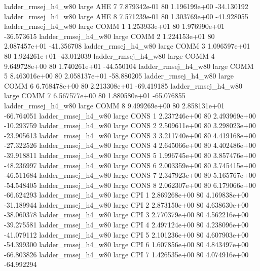 ladder_rmsej_h4_w80      large      AHE                 7 7.879342e-01 80   1.196199e+00         -34.130192
ladder_rmsej_h4_w80      large      AHE                 8 7.571239e-01 80   1.303769e+00         -41.928055
ladder_rmsej_h4_w80      large     COMM                 1 1.253933e+01 80   1.976990e+01         -36.573615
ladder_rmsej_h4_w80      large     COMM                 2 1.224153e+01 80   2.087457e+01         -41.356708
ladder_rmsej_h4_w80      large     COMM                 3 1.096597e+01 80   1.924261e+01         -43.012039
ladder_rmsej_h4_w80      large     COMM                 4 9.649728e+00 80   1.740261e+01         -44.550104
ladder_rmsej_h4_w80      large     COMM                 5 8.463016e+00 80   2.058137e+01         -58.880205
ladder_rmsej_h4_w80      large     COMM                 6 6.768478e+00 80   2.213308e+01         -69.419185
ladder_rmsej_h4_w80      large     COMM                 7 6.567577e+00 80   1.880580e+01         -65.076855
ladder_rmsej_h4_w80      large     COMM                 8 9.499269e+00 80   2.858131e+01         -66.764051
ladder_rmsej_h4_w80      large     CONS                 1 2.237246e+00 80   2.493969e+00         -10.293759
ladder_rmsej_h4_w80      large     CONS                 2 2.509611e+00 80   3.298023e+00         -23.905613
ladder_rmsej_h4_w80      large     CONS                 3 3.211740e+00 80   4.419168e+00         -27.322526
ladder_rmsej_h4_w80      large     CONS                 4 2.645066e+00 80   4.402486e+00         -39.918811
ladder_rmsej_h4_w80      large     CONS                 5 1.996745e+00 80   3.857476e+00         -48.236997
ladder_rmsej_h4_w80      large     CONS                 6 2.003359e+00 80   3.745415e+00         -46.511684
ladder_rmsej_h4_w80      large     CONS                 7 2.347923e+00 80   5.165767e+00         -54.548405
ladder_rmsej_h4_w80      large     CONS                 8 2.062307e+00 80   6.179066e+00         -66.624293
ladder_rmsej_h4_w80      large      CPI                 1 2.869268e+00 80   4.169838e+00         -31.189944
ladder_rmsej_h4_w80      large      CPI                 2 2.873150e+00 80   4.638630e+00         -38.060378
ladder_rmsej_h4_w80      large      CPI                 3 2.770379e+00 80   4.562216e+00         -39.275581
ladder_rmsej_h4_w80      large      CPI                 4 2.497124e+00 80   4.238096e+00         -41.079112
ladder_rmsej_h4_w80      large      CPI                 5 2.101236e+00 80   4.607903e+00         -54.399300
ladder_rmsej_h4_w80      large      CPI                 6 1.607856e+00 80   4.843497e+00         -66.803826
ladder_rmsej_h4_w80      large      CPI                 7 1.426535e+00 80   4.074916e+00         -64.992294
